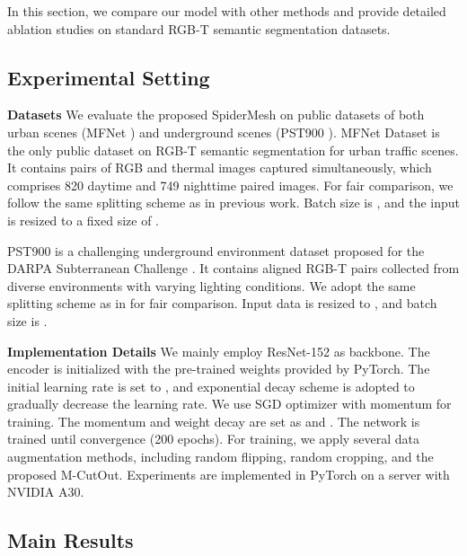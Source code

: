 \documentclass[letterpaper, 10 pt, conference]{ieeeconf}
\begin{document}
In this section, we compare our model with other methods and provide detailed ablation studies on standard RGB-T semantic segmentation datasets.


\subsection{Experimental Setting}


\textbf{Datasets}
We evaluate the proposed SpiderMesh on public datasets of both urban scenes (MFNet \cite{mfnet}) and underground scenes (PST900 \cite{pst900}). 
MFNet Dataset \cite{mfnet} is the only public dataset on RGB-T semantic segmentation for urban traffic scenes. It contains  pairs of RGB and thermal images captured simultaneously, which comprises 820 daytime and 749 nighttime paired images. For fair comparison, we follow the same splitting scheme as in previous work. Batch size is , and the input is resized to a fixed size of .

PST900 is a challenging underground environment dataset proposed for the DARPA Subterranean Challenge \cite{pst900}. It contains  aligned RGB-T pairs collected from diverse environments with varying lighting conditions. We adopt the same splitting scheme as in \cite{pst900} for fair comparison. Input data is resized to , and batch size is .



\textbf{Implementation Details}
We mainly employ ResNet-152 as backbone. The encoder is initialized with the pre-trained weights provided by PyTorch. The initial learning rate is set to , and exponential decay scheme is adopted to gradually decrease the learning rate. We use SGD optimizer with momentum for training. The momentum and weight decay are set as  and . The network is trained until convergence (200 epochs). For training, we apply several data augmentation methods, including random flipping, random cropping, and the proposed M-CutOut. Experiments are implemented in PyTorch on a server with NVIDIA A30.

\subsection{Main Results}
\end{document}
